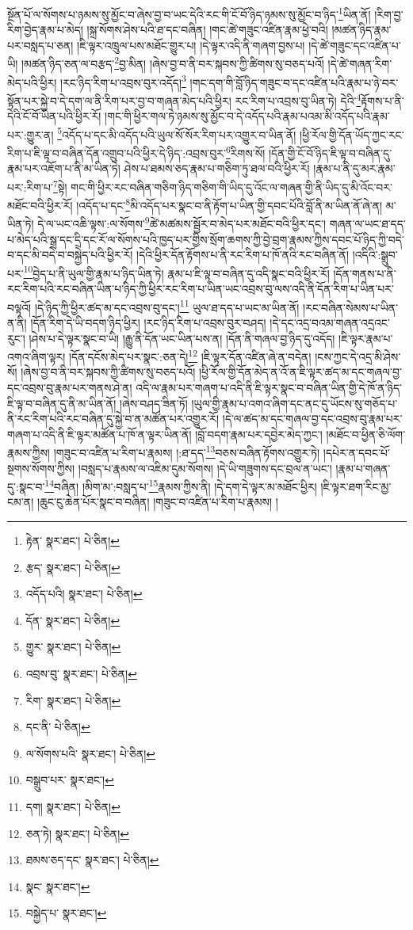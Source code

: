 སྔོན་པོ་ལ་སོགས་པ་ཉམས་སུ་མྱོང་བ་ཞེས་བྱ་བ་ཡང་དེའི་རང་གི་ངོ་བོ་ཉིད་ཉམས་སུ་མྱོང་བ་ཉིད་\footnote{རྟེན་  སྣར་ཐང་།  པེ་ཅིན། }ཡིན་ནོ། །རིག་བྱ་རིག་བྱེད་རྣམ་པ་མེད། །སྐྲ་སོགས་ཤེས་པའི་ཐ་དང་བཞིན། །གང་ཚེ་གཟུང་འཛིན་རྣམ་ཕྱེ་བའི། །མཚན་ཉིད་རྣམ་པར་བསླད་པ་ཅན། །ཇི་ལྟར་འཁྲུལ་པས་མཐོང་གྱུར་པ། །དེ་ལྟར་འདི་ནི་གཞག་བྱས་པ། །དེ་ཚེ་གཟུང་དང་འཛིན་པ་ཡི། །མཚན་ཉིད་ཅན་ལ་བརྩད་\footnote{རྩད་  སྣར་ཐང་།  པེ་ཅིན། }བྱ་མིན། །ཞེས་བྱ་བ་ནི་བར་སྐབས་ཀྱི་ཚིགས་སུ་བཅད་པའོ། །དེ་ཚེ་གཞན་རིག་མེད་པའི་ཕྱིར། །རང་ཉིད་རིག་པ་འབྲས་བུར་འདོད།\footnote{འདོད་པའི།  སྣར་ཐང་།  པེ་ཅིན། } །གང་དག་གི་བློ་ཉིད་གཟུང་བ་དང་འཛིན་པའི་རྣམ་པ་ཉེ་བར་སྟོན་པར་སྐྱེ་བ་དེ་དག་ལ་ནི་རིག་པར་བྱ་བ་གཞན་མེད་པའི་ཕྱིར། རང་རིག་པ་འབྲས་བུ་ཡིན་ཏེ། དེའི་\footnote{དོན་  སྣར་ཐང་།  པེ་ཅིན། }རྟོགས་པ་ནི་དེའི་ངོ་བོ་ཡིན་པའི་ཕྱིར་རོ། །གང་གི་ཕྱིར་གལ་ཏེ་ཉམས་སུ་མྱོང་བ་དེ་འདོད་པའི་རྣམ་པའམ་མི་འདོད་པའི་རྣམ་པར་:གྱུར་ན། \footnote{གྱུར་  སྣར་ཐང་།  པེ་ཅིན། }འདོད་པ་དང་མི་འདོད་པའི་ཡུལ་སོ་སོར་རིག་པར་འགྱུར་བ་ཡིན་ནོ། །ཕྱི་རོལ་གྱི་དོན་ཡོད་ཀྱང་རང་རིག་པ་ཇི་ལྟ་བ་བཞིན་དོན་འགྲུབ་པའི་ཕྱིར་དེ་ཉིད་:འབྲས་བུར་\footnote{འབྲས་བུ་  སྣར་ཐང་།  པེ་ཅིན། }རིགས་སོ། །དོན་གྱི་ངོ་བོ་ཉིད་ཇི་ལྟ་བ་བཞིན་དུ་རྣམ་པར་འཇོག་པ་ནི་མ་ཡིན་ཏེ། ཤེས་པ་ཐམས་ཅད་རྣམ་པ་གཅིག་ཏུ་ཐལ་བའི་ཕྱིར་རོ། །རྣམ་པ་ནི་དུ་མར་རྣམ་པར་:རིག་པ་\footnote{རིག་  སྣར་ཐང་།  པེ་ཅིན། }སྟེ། གང་གི་ཕྱིར་རང་བཞིན་གཅིག་ཉིད་གཅིག་གི་ཡིད་དུ་འོང་ལ་གཞན་གྱི་ནི་ཡིད་དུ་མི་འོང་བར་མཐོང་བའི་ཕྱིར་རོ། །འདོད་པ་དང་\footnote{དང་ནི་  པེ་ཅིན། }མི་འདོད་པར་སྣང་བ་ནི་རྟོག་པ་ཡིན་གྱི་དབང་པོའི་བློ་ནི་མ་ཡིན་ནོ་ཞེ་ན། མ་ཡིན་ཏེ། དེ་ལ་ཡང་འཆི་ལྟས་:ལ་སོགས་\footnote{ལ་སོགས་པའི་  སྣར་ཐང་།  པེ་ཅིན། }ཚེ་མཚམས་སྦྱོར་བ་མེད་པར་མཐོང་བའི་ཕྱིར་དང་། གཞན་ལ་ཡང་ཐ་དད་པ་མེད་པའི་སྒྲ་དང་དྲི་དང་རོ་ལ་སོགས་པའི་ཁྱད་པར་གྱིས་སྲོག་ཆགས་ཀྱི་བྱེ་བྲག་རྣམས་ཀྱིས་དབང་པོ་ཉིད་ཀྱི་བདེ་བ་དང་མི་བདེ་བ་བསྐྱེད་པའི་ཕྱིར་རོ། །དེའི་ཕྱིར་དོན་རྟོགས་པ་ནི་རང་རིག་པ་ཁོ་ནའི་རང་བཞིན་ནོ། །འདིའི་:སྒྲུབ་པར་\footnote{བསྒྲུབ་པར་  སྣར་ཐང་། }བྱེད་པ་ནི་ཡུལ་གྱི་རྣམ་པ་ཉིད་ཡིན་ཏེ། རྣམ་པ་ཇི་ལྟ་བ་བཞིན་དུ་འདི་སྣང་བའི་ཕྱིར་རོ། །དོན་གནས་པ་ནི་རང་རིག་པའི་རང་བཞིན་ཡིན་པ་ཉིད་ཀྱི་ཕྱིར་རང་རིག་པ་ཡིན་ཡང་འབྲས་བུ་ལས་འདི་ནི་དོན་རིག་པ་ཡིན་པར་བལྟའོ། །དེ་ཉིད་ཀྱི་ཕྱིར་ཚད་མ་དང་འབྲས་བུ་དང་།\footnote{དག།  སྣར་ཐང་།  པེ་ཅིན། } ཡུལ་ཐ་དད་པ་ཡང་མ་ཡིན་ནོ། །རང་བཞིན་སེམས་པ་ཡིན་ན་ནི། །དོན་རིག་དེ་ཡི་བདག་ཉིད་ཕྱིར། །རང་ཉིད་རིག་པ་འབྲས་བུར་བཤད། །དེ་དང་འདྲ་བའམ་གཞན་འདྲའང་རུང་། །ཤེས་པ་དེ་ལྟར་སྣང་བ་ཡི། །རྒྱུ་ནི་དོན་ཡང་ཡིན་པས་ན། །དོན་ནི་གཞལ་བྱ་ཉིད་དུ་འདོད། །ཇི་ལྟར་རྣམ་པ་འགའ་ཞིག་ལྟར། །དོན་དངོས་མེད་པར་སྣང་:ཅན་དེ།\footnote{ཅན་ཏེ།  སྣར་ཐང་།  པེ་ཅིན། } །ཇི་ལྟར་དོན་འཛིན་ཞེ་ན་བདེན། །ངས་ཀྱང་དེ་འདྲ་མི་ཤེས་སོ། །ཞེས་བྱ་བ་ནི་བར་སྐབས་ཀྱི་ཚིགས་སུ་བཅད་པའོ། །ཕྱི་རོལ་གྱི་དོན་མེད་ན་འོ་ན་ཇི་ལྟར་ཚད་མ་དང་གཞལ་བྱ་དང་འབྲས་བུ་རྣམ་པར་གནས་ཤེ་ན། འདི་ལ་རྣམ་པར་གཞག་པ་འདི་ནི་ཇི་ལྟར་སྣང་བ་བཞིན་ཡིན་གྱི་དེ་ཁོ་ན་ཉིད་ཇི་ལྟ་བ་བཞིན་དུ་ནི་མ་ཡིན་ནོ། །ཞེས་བཤད་ཟིན་ཏོ། །ཡུལ་གྱི་རྣམ་པ་འགའ་ཞིག་དང་ནང་དུ་ཡོངས་སུ་གཅོད་པ་ནི་རང་རིག་པའི་རང་བཞིན་དུ་སྐྱེ་བ་ན་མཚོན་པར་འགྱུར་རོ། །དེ་ལ་ཚད་མ་དང་གཞལ་བྱ་དང་འབྲས་བུ་རྣམ་པར་གཞག་པ་འདི་ནི་ཇི་ལྟར་མཚོན་པ་ཁོ་ན་ལྟར་ཡིན་ནོ། །བློ་བདག་རྣམ་པར་དབྱེར་མེད་ཀྱང་། །མཐོང་བ་ཕྱིན་ཅི་ལོག་རྣམས་ཀྱིས། །གཟུང་བ་འཛིན་པ་རིག་པ་རྣམས། །:ཐ་དད་\footnote{ཐམས་ཅད་དང་  སྣར་ཐང་།  པེ་ཅིན། }བཅས་བཞིན་རྟོགས་འགྱུར་ཏེ། །དཔེར་ན་དབང་པོ་སྔགས་སོགས་ཀྱིས། །བསླད་པ་རྣམས་ལ་འཇིམ་དུམ་སོགས། །དེ་ཡི་གཟུགས་དང་བྲལ་ན་ཡང་། །རྣམ་པ་གཞན་དུ་:སྣང་བ་\footnote{སྣང་  སྣར་ཐང་། }བཞིན། །མིག་མ་:བསླད་པ་\footnote{བསྐྱེད་པ་  སྣར་ཐང་། }རྣམས་ཀྱིས་ནི། །དེ་དག་དེ་ལྟར་མ་མཐོང་ཕྱིར། །ཇི་ལྟར་ཐག་རིང་མྱ་ངམ་ན། །ཆུང་ངུ་ཆེན་པོར་སྣང་བ་བཞིན། །གཟུང་བ་འཛིན་པ་རིག་པ་རྣམས། །
